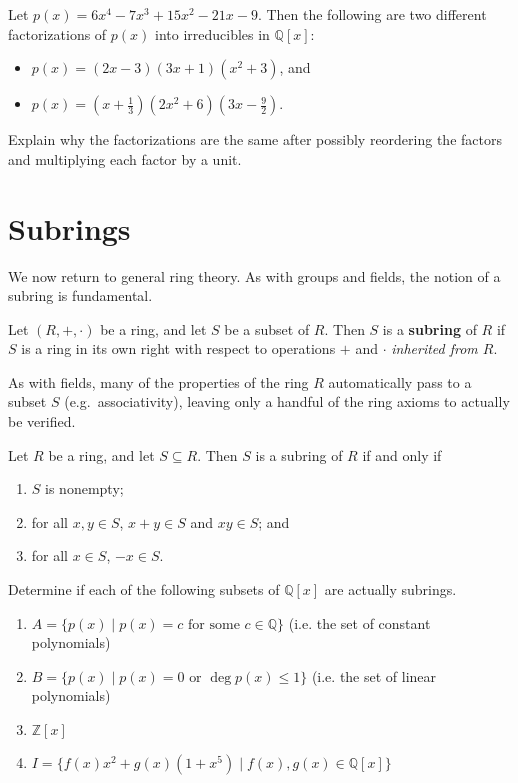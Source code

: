 \begin{problem}
Let $p(x) = 6 x^4 - 7 x^3 + 15 x^2 - 21 x - 9$. Then the following are two different factorizations of $p(x)$ into irreducibles in $\mathbb{Q}[x]$:
\begin{itemize}
\item $p(x) = (2x-3)(3x+1)(x^2+3)$, and
\item $p(x) = (x+\frac{1}{3})(2x^2+6)(3x-\frac{9}{2})$.
\end{itemize}
 Explain why the factorizations are the same after possibly reordering the factors and multiplying each factor by a unit.
\end{problem}

\section{Subrings}
We now return to general ring theory. As with groups and fields, the notion of a subring is fundamental. 

\begin{definition}
Let $(R,+,\cdot)$ be a ring, and let $S$ be a subset of $R$. Then $S$ is a \textbf{subring} of $R$ if $S$ is a ring in its own right with respect to operations $+$ and $\cdot$ \emph{inherited from $R$}.
\end{definition}

As with fields, many of the properties of the ring $R$ automatically pass to a subset $S$ (e.g.~associativity), leaving only a handful of the ring axioms to actually be verified.

\begin{theorem}
Let $R$ be a ring, and let $S\subseteq R$. Then $S$ is a subring of $R$ if and only if 
\begin{enumerate}
\item $S$ is nonempty;
\item for all $x,y\in S$, $x+y\in S$ and  $xy\in S$; and
\item for all $x\in S$, $-x\in S$.
\end{enumerate}
\end{theorem}

\begin{problem}
Determine if each of the following subsets of $\mathbb{Q}[x]$ are actually subrings.
\begin{enumerate}
\item $A = \{p(x) \mid p(x) = c \text{ for some $c\in \mathbb{Q}$}\}$ (i.e. the set of constant polynomials)
\item $B = \{p(x)\mid p(x) = 0 \text{ or } \deg p(x) \le 1\}$ (i.e. the set of linear polynomials)
\item $\mathbb{Z}[x]$
\item $I = \{f(x)x^2 + g(x)(1+x^5)\mid f(x),g(x)\in \mathbb{Q}[x]\}$
\end{enumerate} 
\end{problem}


